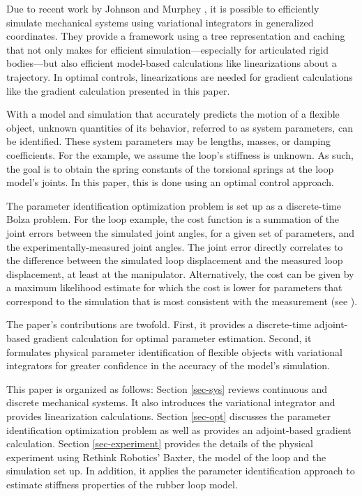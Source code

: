 \documentclass[letterpaper, 10pt, conference]{ieeeconf}
\begin{document}
Due to recent work by Johnson and Murphey \cite{johnson_murphey_scalable, johnson_murphey_linearization}, it is possible to efficiently simulate mechanical systems using variational integrators in generalized coordinates. They provide a framework using a tree representation and caching that not only makes for efficient simulation---especially for articulated rigid bodies---but also efficient model-based calculations like linearizations about a trajectory.   In optimal controls, linearizations are needed for gradient calculations like the gradient calculation presented in this paper.  %

With a model and simulation that accurately predicts the motion of a flexible object, unknown quantities of its behavior, referred to as system parameters, can be identified.  These system parameters may be lengths, masses, or damping coefficients.  For the example, we assume the loop's stiffness is unknown.  As such, the goal is to obtain the spring constants of the torsional springs at the loop model's joints.  In this paper, this is done using an optimal control approach.

The parameter identification optimization problem is set up as a discrete-time Bolza problem.  For the loop example, the cost function is a summation of the joint errors between the simulated joint angles, for a given set of parameters, and the experimentally-measured joint angles.  The joint error directly correlates to the difference between the simulated loop displacement and the measured loop displacement, at least at the manipulator.  Alternatively, the cost can be given by a maximum likelihood estimate for which the cost is lower for parameters that correspond to the simulation that is most consistent with the measurement (see \cite{houska_etal}).  

The paper's contributions are twofold.  First, it provides a discrete-time adjoint-based gradient calculation for optimal parameter estimation.  Second, it formulates physical parameter identification of flexible objects with variational integrators for greater confidence in the accuracy of the model's simulation.

This paper is organized as follows: Section \ref{sec-sys} reviews continuous and discrete mechanical systems.  It also introduces the variational integrator and provides linearization calculations.  Section \ref{sec-opt} discusses the parameter identification optimization problem as well as provides an adjoint-based gradient calculation.  Section \ref{sec-experiment} provides the details of the physical experiment using Rethink Robotics' Baxter, the model of the loop and the simulation set up.  In addition, it applies the parameter identification approach to estimate stiffness properties of the rubber loop model.
\end{document}
